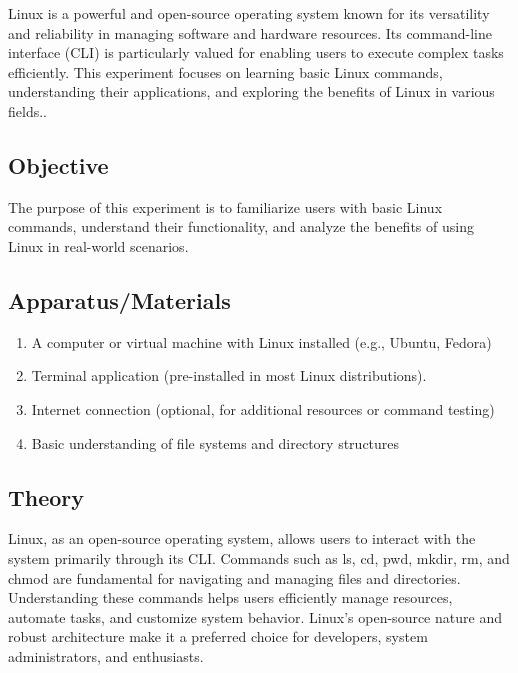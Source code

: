 \documentclass[a4paper,9pt]{article}
\begin{document}
Linux is a powerful and open-source operating system known for its versatility and reliability in managing software and hardware resources. Its command-line interface (CLI) is particularly valued for enabling users to execute complex tasks efficiently. This experiment focuses on learning basic Linux commands, understanding their applications, and exploring the benefits of Linux in various fields..

\subsection{Objective}
The purpose of this experiment is to familiarize users with basic Linux commands, understand their functionality, and analyze the benefits of using Linux in real-world scenarios.
\subsection{Apparatus/Materials}
\begin{enumerate}
	\item A computer or virtual machine with Linux installed (e.g., Ubuntu, Fedora)
	\item Terminal application (pre-installed in most Linux distributions).
	\item Internet connection (optional, for additional resources or command testing)
	\item Basic understanding of file systems and directory structures
	
\end{enumerate}
\subsection{Theory}
Linux, as an open-source operating system, allows users to interact with the system primarily through its CLI. Commands such as ls, cd, pwd, mkdir, rm, and chmod are fundamental for navigating and managing files and directories. Understanding these commands helps users efficiently manage resources, automate tasks, and customize system behavior. Linux’s open-source nature and robust architecture make it a preferred choice for developers, system administrators, and enthusiasts.
\end{document}
